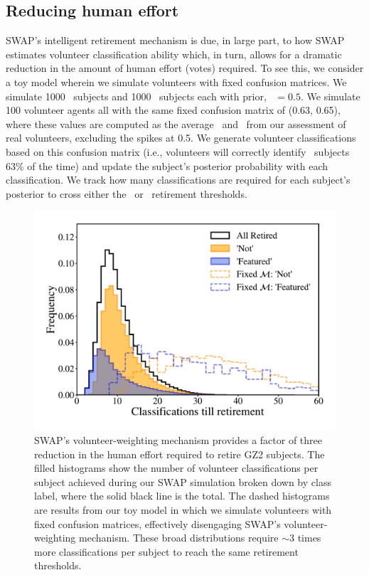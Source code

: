 \subsection{Reducing human effort}\label{chap3: human effort}

SWAP's intelligent retirement mechanism is due, in large part, to how SWAP estimates volunteer classification ability which, in turn, allows for a dramatic reduction in the amount of human effort (votes) required. To see this, we consider a toy model wherein we simulate volunteers with fixed confusion matrices. We simulate 1000 \feat~subjects and 1000 \notfeat~subjects each with prior, \p~$ = 0.5$. We simulate 100 volunteer agents all with the same fixed confusion matrix of (0.63, 0.65), where these values are computed as the average \Pf~and \Pn~from our assessment of real volunteers, excluding the spikes at 0.5. We generate volunteer classifications based on this confusion matrix (i.e., volunteers will correctly identify \feat~subjects 63\% of the time) and update the subject's posterior probability with each classification. We track how many classifications are required for each subject's posterior to cross either the \feat~or \notfeat~retirement thresholds. 


\begin{figure}
\centering
\includegraphics[width=5in]{Figures/human_machine/f7.pdf}
\caption[SWAP's volunteer-weighting mechanism provides a factor of three reduction in the required human effort for classification tasks.]{SWAP's volunteer-weighting mechanism provides a factor of three reduction in the human effort required to retire GZ2 subjects. The filled histograms show the number of volunteer classifications per subject achieved during our SWAP simulation broken down by class label, where the solid black line is the total. The dashed histograms are results from our toy model in which we simulate volunteers with fixed confusion matrices, effectively disengaging SWAP's volunteer-weighting mechanism. These broad distributions require $\sim$3 times more classifications per subject to reach the same retirement thresholds.} 
\label{fig: swap vote distributions}
\end{figure}

